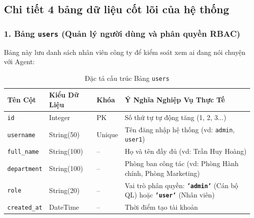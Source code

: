 \documentclass[11pt,a4paper]{article}
\begin{document}
\subsection{Chi tiết 4 bảng dữ liệu cốt lõi của hệ thống}

\subsubsection{1. Bảng \texttt{users} (Quản lý người dùng và phân quyền RBAC)}
Bảng này lưu danh sách nhân viên công ty để kiểm soát xem ai đang nói chuyện với Agent:
\begin{table}[H]
\centering
\small
\begin{tabularx}{\textwidth}{l l l X}
\toprule
\textbf{Tên Cột} & \textbf{Kiểu Dữ Liệu} & \textbf{Khóa} & \textbf{Ý Nghĩa Nghiệp Vụ Thực Tế} \\
\midrule
\texttt{id} & Integer & PK & Số thứ tự tự động tăng (1, 2, 3...) \\
\texttt{username} & String(50) & Unique & Tên đăng nhập hệ thống (vd: \texttt{admin}, \texttt{user1}) \\
\texttt{full\_name} & String(100) & -- & Họ và tên đầy đủ (vd: Trần Huy Hoàng) \\
\texttt{department} & String(100) & -- & Phòng ban công tác (vd: Phòng Hành chính, Phòng Marketing) \\
\texttt{role} & String(20) & -- & Vai trò phân quyền: \textbf{\texttt{'admin'}} (Cán bộ QL) hoặc \textbf{\texttt{'user'}} (Nhân viên) \\
\texttt{created\_at} & DateTime & -- & Thời điểm tạo tài khoản \\
\bottomrule
\end{tabularx}
\caption{Đặc tả cấu trúc Bảng \texttt{users}}
\end{table}
\end{document}
